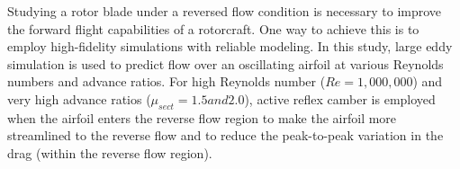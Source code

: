 Studying a rotor blade under a reversed flow condition
is necessary to improve the forward flight capabilities of a rotorcraft.
One way to achieve this is to employ high-fidelity simulations with reliable modeling.
In this study, large eddy simulation is used to predict flow over an oscillating airfoil at various Reynolds numbers and advance ratios.
For high Reynolds number ($Re=1,000,000$) and very high advance ratios ($\mu_{sect}=1.5 and 2.0$), active reflex camber is employed when the airfoil enters
the reverse flow region to make the airfoil more streamlined to the reverse flow and to reduce
the peak-to-peak variation in the drag (within the reverse flow region).



